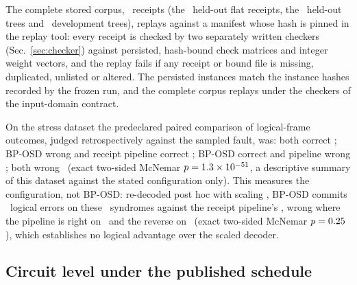 \documentclass[aps,pra,twocolumn,superscriptaddress,nofootinbib,longbibliography,floatfix]{revtex4-2}
\begin{document}
The complete stored corpus, \ReplayReceipts\ receipts (the \HoFlat\ held-out flat receipts, the \HoTrees\ held-out trees and \ReplayDevTrees\ development trees), replays against a manifest whose hash is pinned in the replay tool: every receipt is checked by two separately written checkers (Sec.~\ref{sec:checker}) against persisted, hash-bound check matrices and integer weight vectors, and the replay fails if any receipt or bound file is missing, duplicated, unlisted or altered. The persisted instances match the instance hashes recorded by the frozen run, and the complete corpus replays under the checkers of the input-domain contract.

On the stress dataset the predeclared paired comparison of logical-frame outcomes, judged retrospectively against the sampled fault, was: both correct \HoStressBothOk; BP-OSD wrong and receipt pipeline correct \HoStressBpWrongPipeOk; BP-OSD correct and pipeline wrong \HoStressBpOkPipeWrong; both wrong \HoStressBothWrong\ (exact two-sided McNemar $p=1.3\times 10^{-51}$, a descriptive summary of this dataset against the stated configuration only). This measures the configuration, not BP-OSD: re-decoded post hoc with scaling \ScaledAlpha, BP-OSD commits \HoPostStressBpErrScaled\ logical errors on these \HoPostStressN\ syndromes against the receipt pipeline's \HoPostStressPipeErr, wrong where the pipeline is right on \HoPostStressPairScaledWrong\ and the reverse on \HoPostStressPairPipeWrong\ (exact two-sided McNemar $p=0.25$), which establishes no logical advantage over the scaled decoder.

\subsection{Circuit level under the published schedule}
\label{sec:circuit}
\end{document}
